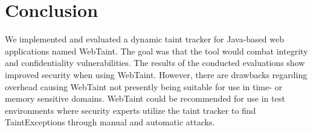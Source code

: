 \chapter{Conclusion}
\label{Conclusion}
We implemented and evaluated a dynamic taint tracker for Java-based web applications named WebTaint. The goal was that the tool would combat integrity and confidentiality vulnerabilities. The results of the conducted evaluations show improved security when using WebTaint. However, there are drawbacks regarding overhead causing WebTaint not presently being suitable for use in time- or memory sensitive domains. WebTaint could be recommended for use in test environments where security experts utilize the taint tracker to find TaintExceptions through manual and automatic attacks.
